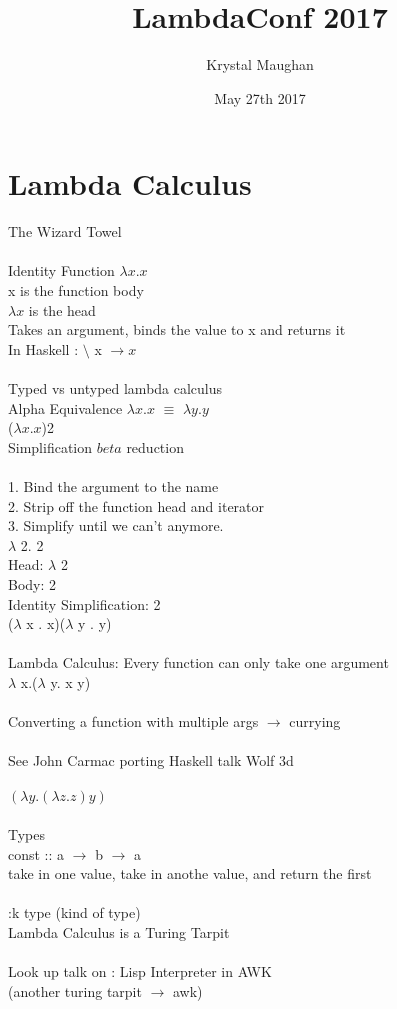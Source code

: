 \documentclass{article}
\title{LambdaConf 2017}
\author{Krystal Maughan }
\date{May 27th 2017}
\begin{document}
\maketitle

\section{Lambda Calculus}
The Wizard Towel
\\
\\
Identity Function
$\lambda x . x$
\\
x is the function body
\\
$\lambda x$ is the head
\\
Takes an argument, binds the value to x and returns it
\\
In Haskell :  $\setminus$ x $\rightarrow x$
\\
\\
Typed vs untyped lambda calculus
\\
Alpha Equivalence $\lambda x.x$ $\equiv$ $\lambda y.y$
\\
($\lambda x.x$)2
\\
Simplification $beta$ reduction
\\
\\
1. Bind the argument to the name
\\
2. Strip off the function head and iterator
\\
3. Simplify until we can't anymore.
\\
$\lambda$ 2. 2
\\
Head: $\lambda$ 2
\\
Body: 2 
\\
Identity Simplification: 2
\\
($\lambda$ x . x)($\lambda$ y . y)
\\
\\
Lambda Calculus: Every function can only take one argument
\\
$\lambda$ x.($\lambda$ y. x y)
\\
\\
Converting a function with multiple args $\rightarrow$ currying
\\
\\
See John Carmac porting Haskell talk Wolf 3d
\\
\\
$(\lambda y . ( \lambda z . z) y)$
\\
\\
Types
\\
const :: a $\rightarrow$ b $\rightarrow$ a
\\
take in one value, take in anothe value, and return the first
\\
\\
:k type (kind of type)
\\
Lambda Calculus is a Turing Tarpit
\\
\\
Look up talk on : Lisp Interpreter in AWK
\\
(another turing tarpit $\rightarrow$ awk)
\\
\\
\end{document}
